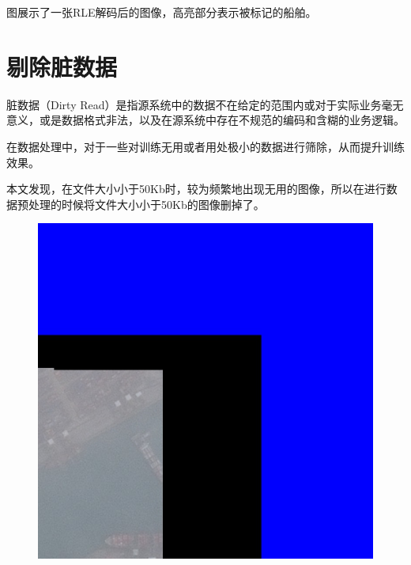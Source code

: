 图展示了一张RLE解码后的图像，高亮部分表示被标记的船舶。

\section{剔除脏数据}

脏数据（Dirty
Read）是指源系统中的数据不在给定的范围内或对于实际业务毫无意义，或是数据格式非法，以及在源系统中存在不规范的编码和含糊的业务逻辑。

在数据处理中，对于一些对训练无用或者用处极小的数据进行筛除，从而提升训练效果。

本文发现，在文件大小小于50Kb时，较为频繁地出现无用的图像，所以在进行数据预处理的时候将文件大小小于50Kb的图像删掉了。

\begin{figure}
\centering
\includegraphics{preprocessing_pic/2.1.jpg}
\caption{}
\end{figure}

